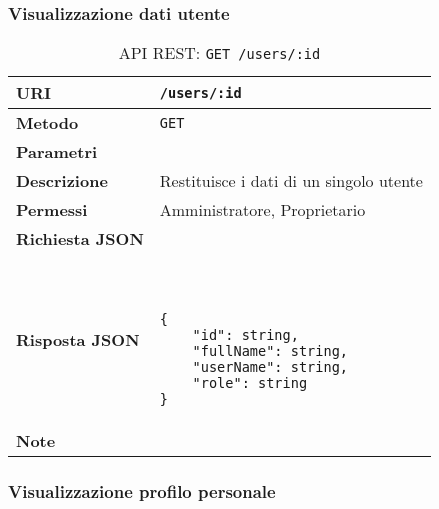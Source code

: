     \subsubsection{Visualizzazione dati utente}

        \begin{table}[H]
            \begin{center}
                \begin{tabular}{p{} p{}}
                    \toprule
                    \textbf{URI} & \texttt{/users/:id} \\ \midrule
                    \textbf{Metodo} & \texttt{GET} \\ \midrule
                    \textbf{Parametri} & \\ \midrule
                    \textbf{Descrizione} & Restituisce i dati di un singolo utente \\ \midrule
                    \textbf{Permessi} & Amministratore, Proprietario  \\ \midrule
                    \textbf{Richiesta JSON} & \\ \midrule
                    \textbf{Risposta JSON} & \
                        \begin{lstlisting}[basicstyle={\ttfamily}]
{
    "id": string,
    "fullName": string,
    "userName": string,
    "role": string
}
                        \end{lstlisting}
                        \\ \midrule
                    \textbf{Note} & \\
                    \bottomrule
                \end{tabular}
                \caption{API REST: \texttt{GET /users/:id}}
            \end{center}
        \end{table}

    \subsubsection{Visualizzazione profilo personale}

